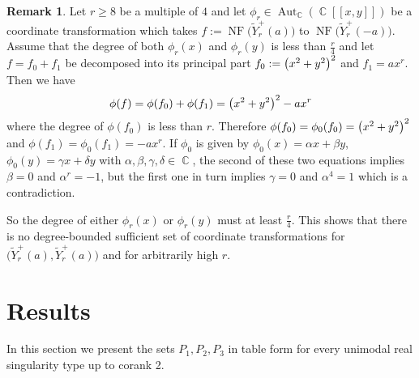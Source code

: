 \documentclass[noend]{amsproc}
\theoremstyle{definition}
\newtheorem{remark}[theorem]{Remark}
\let\originalleft\left
\let\originalright\right
\renewcommand{\left}{\mathopen{}\mathclose\bgroup\originalleft}
\renewcommand{\right}{\aftergroup\egroup\originalright}
\newcommand{\tY}{\widetilde{Y}}
\DeclareMathOperator{\C}{\mathbb{C}}
\DeclareMathOperator{\NF}{NF}
\DeclareMathOperator{\Aut}{Aut}
\begin{document}
\begin{remark}\label{rem:sufficient_sets_for_Yr}
Let $r \geq 8$ be a multiple of $4$ and let $\phi_r \in \Aut_{\C}(\C[[x,y]])$
be a coordinate transformation which takes $f := \NF\bigl(\tY_r^+(a)\bigr)$ to
$\NF\bigl(\tY_r^+(-a)\bigr)$. Assume that the degree of both $\phi_r(x)$ and
$\phi_r(y)$ is less than $\frac{r}{4}$ and let $f = f_0 + f_1$ be decomposed
into its principal part $f_0 := \left(x^2+y^2\right)^2$ and $f_1 = ax^r$. Then
we have
\[
\phi(f) = \phi(f_0) + \phi(f_1) = \left(x^2+y^2\right)^2 - ax^r
\]
where the degree of $\phi(f_0)$ is less than $r$. Therefore
$\phi(f_0) = \phi_0(f_0) = \left(x^2+y^2\right)^2$ and
$\phi(f_1) = \phi_0(f_1) = -ax^r$. If $\phi_0$ is given by
$\phi_0(x) = \alpha x + \beta y$, $\phi_0(y) = \gamma x + \delta y$ with
$\alpha, \beta, \gamma, \delta \in \C$, the second of these two equations
implies $\beta = 0$ and $\alpha^r = -1$, but the first one in turn implies
$\gamma = 0$ and $\alpha^4 = 1$ which is a contradiction.

So the degree of either $\phi_r(x)$ or $\phi_r(y)$ must at least $\frac{r}{4}$.
This shows that there is no degree-bounded sufficient set of coordinate
transformations for $\bigl(\tY_r^+(a), \tY_r^+(a)\bigr)$ and for arbitrarily
high $r$.
\end{remark}


\section{Results}\label{sec:results}

In this section we present the sets $P_1,P_2,P_3$ in table form for every
unimodal real singularity type up to corank 2.
\end{document}
